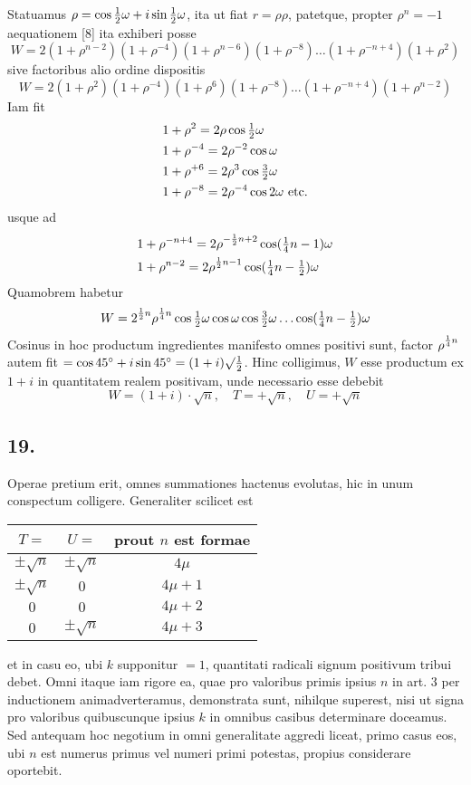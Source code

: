 \documentclass[twoside,12pt]{memoir}
\let\oldfrac\frac
\def\frac#1#2{\mathchoice{\tfrac{#1}{#2}}{\oldfrac{#1}{#2}}{\genfrac{}{}{}{2}{#1}{#2\mathstrut}}{\genfrac{}{}{}{3}{#1}{#2\mathstrut}}}
\begin{document}
Statuamus \(\rho=\cos \frac{1}{2} \omega+i \sin \frac{1}{2} \omega\), ita ut fiat \(r=\rho \rho\), patetque, propter \(\rho^{n}=-1\) aequationem [8] ita exhiberi posse
\[W=2(1+\rho^{n-2})(1+\rho^{-4})(1+\rho^{n-6})(1+\rho^{-8}) \ldots(1+\rho^{-n+4})(1+\rho^{2})\]
sive factoribus alio ordine dispositis
\[W=2(1+\rho^{2})(1+\rho^{-4})(1+\rho^{6})(1+\rho^{-8}) \ldots(1+\rho^{-n+4})(1+\rho^{n-2})\]
Iam fit
\[\begin{aligned}
& 1+\rho^{2}=2 \rho \cos \frac{1}{2} \omega \\
& 1+\rho^{-4}=2 \rho^{-2} \cos \omega \\
& 1+\rho^{+6}=2 \rho^{3} \cos \frac{3}{2} \omega \\
& 1+\rho^{-8}=2 \rho^{-4} \cos 2 \omega \text{ etc.}
\end{aligned}\]
usque ad
\[\begin{aligned}
& 1+\rho^{-n+4}=2 \rho^{-\frac{1}{2} n+2} \cos (\frac{1}{4} n-1) \omega \\
& 1+\rho^{n-2}=2 \rho^{\frac{1}{2} n-1} \cos (\frac{1}{4} n-\frac{1}{2}) \omega
\end{aligned}\]
Quamobrem habetur\pagebreak%
\[W=2^{\frac{1}{2} n} \rho^{\frac{1}{4} n} \cos \frac{1}{2} \omega \cos \omega \cos \frac{3}{2} \omega \ldots \cos (\frac{1}{4} n-\frac{1}{2}) \omega\]
Cosinus in hoc productum ingredientes manifesto omnes positivi sunt, factor \(\rho^{\frac{1}{4}n}\) autem fit \(=\cos 45^{\circ}+i \sin 45^{\circ}=(1+i) \surd \frac{1}{2}\). Hinc colligimus, \(W\) esse productum ex \(1+i\) in quantitatem realem positivam, unde necessario esse debebit
\[W=(1+i) \cdot \surd n, \quad T=+\surd n, \quad U=+\surd n\]

\subsection*{19.}
 
Operae pretium erit, omnes summationes hactenus evolutas, hic in unum conspectum colligere. Generaliter scilicet est
\begin{center}
\begin{tabular}{|c|c|c|}
\hline
\(T=\) & \(U=\) & prout \(n\) est formae \\
\hline
\(\pm \surd n\) & \(\pm \surd n\) & \(4 \mu\) \\
\(\pm \surd n\) & \(0\) & \(4 \mu+1\) \\
\(0\) & \(0\) & \(4 \mu+2\) \\
\(0\) & \(\pm \surd n\) & \(4 \mu+3\) \\
\hline
\end{tabular}
\end{center}
et in casu eo, ubi \(k\) supponitur \(=1\), quantitati radicali signum positivum tribui debet. Omni itaque iam rigore ea, quae pro valoribus primis ipsius \(n\) in art. 3 per inductionem animadverteramus, demonstrata sunt, nihilque superest, nisi ut signa pro valoribus quibuscunque ipsius \(k\) in omnibus casibus determinare doceamus. Sed antequam hoc negotium in omni generalitate aggredi liceat, primo casus eos, ubi \(n\) est numerus primus vel numeri primi potestas, propius considerare oportebit.
\end{document}
